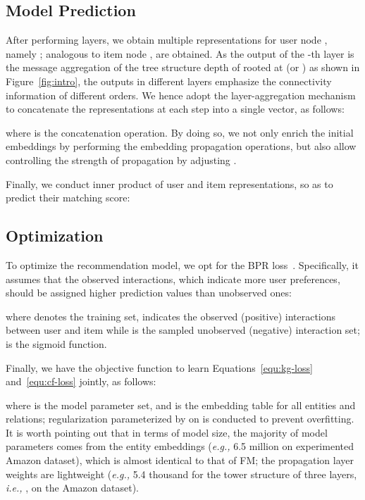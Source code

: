 \documentclass[sigconf]{acmart}
\newcommand{\ie}{\emph{i.e., }}
\newcommand{\eg}{\emph{e.g., }}
\theoremstyle{definition}
\begin{document}
\subsection{Model Prediction}


After performing  layers, we obtain multiple representations for user node , namely ;
analogous to item node ,  are obtained.
As the output of the -th layer is the message aggregation of the tree structure depth of  rooted at  (or ) as shown in Figure~\ref{fig:intro}, the outputs in different layers emphasize the connectivity information of different orders.
We hence adopt the layer-aggregation mechanism~\cite{JumpKG} to concatenate the representations at each step into a single vector, as follows:

where  is the concatenation operation.
By doing so, we not only enrich the initial embeddings by performing the embedding propagation operations, but also allow controlling the strength of propagation by adjusting .

Finally, we conduct inner product of user and item representations, so as to predict their matching score:



\subsection{Optimization}

To optimize the recommendation model, we opt for the BPR loss~\cite{BPRMF}.
Specifically, it assumes that the observed interactions, which indicate more user preferences, should be assigned higher prediction values than unobserved ones:

where  denotes the training set,  indicates the observed (positive) interactions between user  and item  while  is the sampled unobserved (negative) interaction set;
 is the sigmoid function.

Finally, we have the objective function to learn Equations~\eqref{equ:kg-loss} and~\eqref{equ:cf-loss} jointly, as follows:

where  is the model parameter set, and  is the embedding table for all entities and relations;
 regularization parameterized by  on  is conducted to prevent overfitting.
It is worth pointing out that in terms of model size, the majority of model parameters comes from the entity embeddings (\eg 6.5 million on experimented Amazon dataset), which is almost identical to that of FM;
the propagation layer weights are lightweight (\eg 5.4 thousand for the tower structure of three layers, \ie , on the Amazon dataset).
\end{document}
